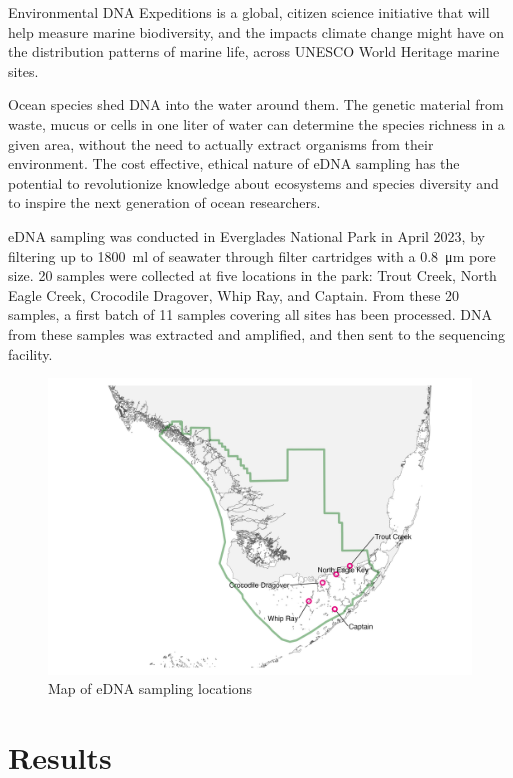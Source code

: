 \documentclass[10pt]{article}
\begin{document}
\begin{multicols}{2}
Environmental DNA Expeditions is a global, citizen science initiative that will help measure marine biodiversity, and the impacts climate change might have on the distribution patterns of marine life, across UNESCO World Heritage marine sites.

Ocean species shed DNA into the water around them. The genetic material from waste, mucus or cells in one liter of water can determine the species richness in a given area, without the need to actually extract organisms from their environment.
The cost effective, ethical nature of eDNA sampling has the potential to revolutionize knowledge about ecosystems and species diversity and to inspire the next generation of ocean researchers.

eDNA sampling was conducted in Everglades National Park in April 2023, by filtering up to \SI{1800}{\milli\litre} of seawater through filter cartridges with a \SI{0.8}{\micro\metre} pore size. 20 samples were collected at five locations in the park: Trout Creek, North Eagle Creek, Crocodile Dragover, Whip Ray, and Captain. From these 20 samples, a first batch of 11 samples covering all sites has been processed. DNA from these samples was extracted and amplified, and then sent to the sequencing facility.
\end{multicols}

\begin{figure}[h]
\centering
\includegraphics[width=\textwidth]{map}
\caption{Map of eDNA sampling locations}
\end{figure}

\section*{Results}
\end{document}

